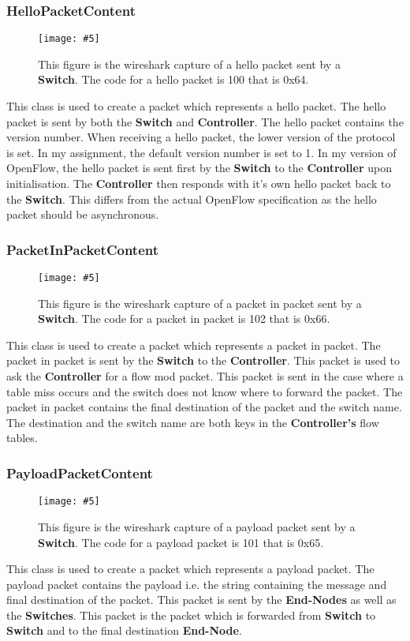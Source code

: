 \documentclass{article}
\newcommand{\includescalefigure}[5]{
  \begin{figure}[H]
    \centering
    \texttt{[image: \#5]}
    \captionsetup{width=.8\linewidth}
    \caption[#2]{#3}
    \label{#1}
  \end{figure}
}
\begin{document}
\subsubsection{HelloPacketContent}
\includescalefigure{hellopacket}{hellopacket}{This figure is the wireshark
capture of a hello packet sent by a \textbf{Switch}. The code for a hello
packet is 100 that is 0x64.}{1}{HelloPacket.png}

This class is used to create a packet which represents a hello packet. The hello
packet is sent by both the \textbf{Switch} and \textbf{Controller}. The hello
packet contains the version number. When receiving a hello packet, the lower
version of the protocol is set. In my assignment, the default version number
is set to 1. In my version of OpenFlow, the hello packet is sent first by the
\textbf{Switch} to the \textbf{Controller} upon initialisation. The
\textbf{Controller} then responds with it's own hello packet back to the
\textbf{Switch}. This differs from the actual OpenFlow specification as the
hello packet should be asynchronous.

\subsubsection{PacketInPacketContent}
\includescalefigure{packetinpacket}{packetinpacket}{This figure is the
wireshark capture of a packet in packet sent by a \textbf{Switch}. The code for
a packet in packet is 102 that is 0x66.}{1}{PacketInPacket.png}

This class is used to create a packet which represents a packet in packet. The
packet in packet is sent by the \textbf{Switch} to the \textbf{Controller}.
This packet is used to ask the \textbf{Controller} for a flow mod packet. This
packet is sent in the case where a table miss occurs and the switch does not
know where to forward the packet. The packet in packet contains the final
destination of the packet and the switch name. The destination and the switch
name are both keys in the \textbf{Controller's} flow tables.

\subsubsection{PayloadPacketContent}
\includescalefigure{payloadpacket}{payloadpacket}{This figure is the wireshark
capture of a payload packet sent by a \textbf{Switch}. The code for a payload
packet is 101 that is 0x65.}{1}{PayloadPacket.png}

This class is used to create a packet which represents a payload packet. The
payload packet contains the payload i.e. the string containing the message and
final destination of the packet. This packet is sent by the \textbf{End-Nodes}
as well as the \textbf{Switches}. This packet is the packet which is forwarded
from \textbf{Switch} to \textbf{Switch} and to the final destination
\textbf{End-Node}.
\end{document}
